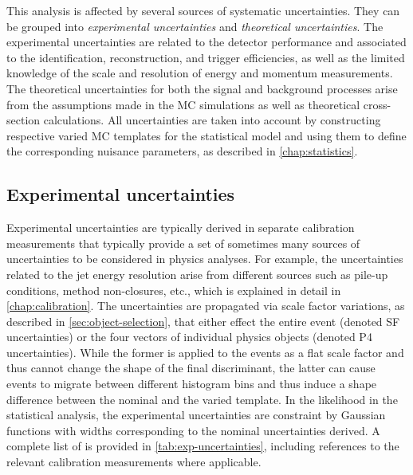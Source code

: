 This analysis is affected by several sources of systematic uncertainties.
They can be grouped into \emph{experimental uncertainties} and \emph{theoretical uncertainties}.
The experimental uncertainties are related to the detector performance and associated to the identification, reconstruction, and trigger efficiencies, as well as the limited knowledge of the scale and resolution of energy and momentum measurements.
The theoretical uncertainties for both the signal and background processes arise from the assumptions made in the MC simulations as well as theoretical cross-section calculations. 
All uncertainties are taken into account by constructing respective varied MC templates for the statistical model and using them to define the corresponding nuisance parameters, as described in \cref{chap:statistics}.

\subsection{Experimental uncertainties}
Experimental uncertainties are typically derived in separate calibration measurements that typically provide a set of sometimes many sources of uncertainties to be considered in physics analyses.
For example, the uncertainties related to the jet energy resolution arise from different sources such as pile-up conditions, method non-closures, etc., which is explained in detail in \cref{chap:calibration}.
The uncertainties are propagated via scale factor variations, as described in \cref{sec:object-selection}, that either effect the entire event (denoted SF uncertainties) or the four vectors of individual physics objects (denoted P4 uncertainties). 
While the former is applied to the events as a flat scale factor and thus cannot change the shape of the final discriminant, the latter can cause events to migrate between different histogram bins and thus induce a shape difference between the nominal and the varied template.
In the likelihood in the statistical analysis, the experimental uncertainties are constraint by Gaussian functions with widths corresponding to the nominal uncertainties derived.
A complete list of is provided in \cref{tab:exp-uncertainties}, including references to the relevant calibration measurements where applicable.

